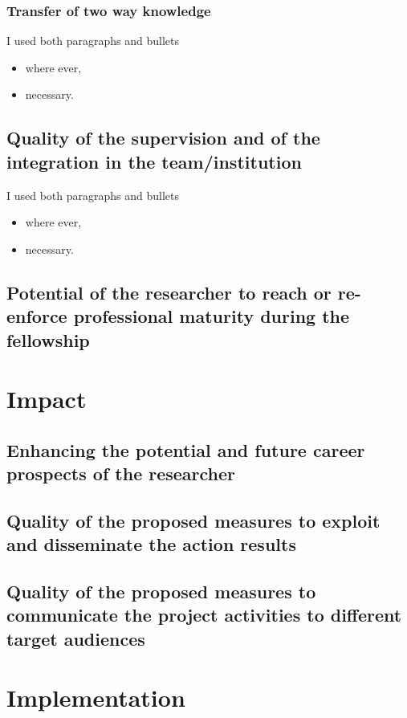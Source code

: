 \documentclass[a4paper,11pt]{extarticle}
\begin{document}
\subsubsection{Transfer of two way knowledge}
I used both paragraphs and bullets \begin{itemize}
    \item where ever,
    \item necessary.
\end{itemize}
\subsection{Quality of the supervision and of the integration in the team/institution}
I used both paragraphs and bullets \begin{itemize}
    \item where ever,
    \item necessary.
\end{itemize}
\subsection{Potential of the researcher to reach or re-enforce professional maturity during the fellowship}
\section{Impact}
\subsection{Enhancing the potential and future career prospects of the researcher}
\subsection{Quality of the proposed measures to exploit and disseminate the action results}
\subsection{Quality of the proposed measures to communicate the project activities to different target audiences}
\section{Implementation}
\end{document}
